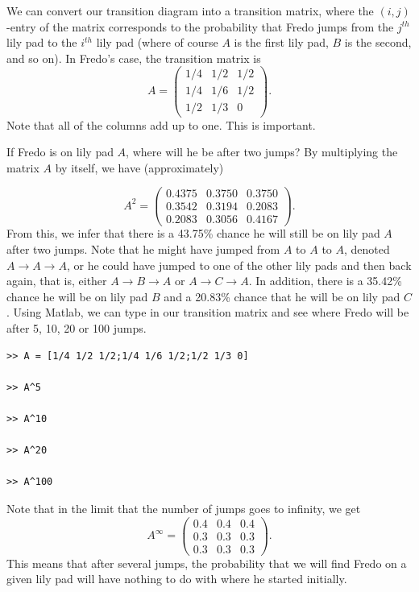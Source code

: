 We can convert our transition diagram into a transition matrix, where the $(i,j)$-entry of the matrix corresponds to the probability that Fredo jumps from the $j^{th}$ lily pad to the $i^{th}$ lily pad (where of course $A$ is the first lily pad, $B$ is the second, and so on).  In Fredo's case, the transition matrix is
\[
A = \begin{pmatrix}
1/4 & 1/2 & 1/2\\
1/4 & 1/6 & 1/2\\
1/2 & 1/3 & 0
\end{pmatrix}.
\]
Note that all of the columns add up to one.  This is important.

If Fredo is on lily pad $A$, where will he be after two jumps?  By multiplying the matrix $A$ by itself, we have (approximately)

\[
A^2 = \begin{pmatrix}
0.4375 & 0.3750 & 0.3750\\
0.3542 & 0.3194 & 0.2083\\
0.2083 & 0.3056 & 0.4167
\end{pmatrix}.
\]
From this, we infer that there is a 43.75\% chance he will still be on lily pad $A$ after two jumps.  Note that he might have jumped from $A$ to $A$ to $A$, denoted $A \rightarrow A \rightarrow A$, or he could have jumped to one of the other lily pads and then back again, that is, either $A \rightarrow B \rightarrow A$ or $A \rightarrow C \rightarrow A$.  In addition, there is a 35.42\% chance he will be on lily pad $B$ and a 20.83\% chance that he will be on lily pad $C$.  Using Matlab, we can type in our transition matrix and see where Fredo will be after 5, 10, 20 or 100 jumps.

\begin{verbatim}
>> A = [1/4 1/2 1/2;1/4 1/6 1/2;1/2 1/3 0]

>> A^5

>> A^10

>> A^20

>> A^100
\end{verbatim}
Note that in the limit that the number of jumps goes to infinity, we get
\[
A^\infty = \begin{pmatrix}
0.4 & 0.4 & 0.4\\
0.3 & 0.3 & 0.3\\
0.3 & 0.3 & 0.3
\end{pmatrix}.
\]
This means that after several jumps, the probability that we will find Fredo on a given lily pad will have nothing to do with where he started initially.
 
